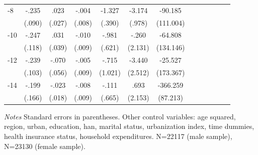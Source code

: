 \begin{table}[p]
\begin{adjustbox}{max width=\linewidth}
\begin{threeparttable}
{\begin{tabular}{l*{6}{SS}}
-8             &    -.235\sym{***}&     .023         &    -.004         &   -1.327\sym{***}&   -3.174\sym{***}&  -90.185         \\
                &   (.090)         &   (.027)         &   (.008)         &   (.390)         &   (.978)         &(111.004)         \\
-10            &    -.247\sym{**} &     .031         &    -.010         &    -.981         &    -.260         &  -64.808         \\
                &   (.118)         &   (.039)         &   (.009)         &   (.621)         &  (2.131)         &(134.146)         \\
-12           &    -.239\sym{**} &    -.070         &    -.005         &    -.715         &   -3.440         &  -25.527         \\
                &   (.103)         &   (.056)         &   (.009)         &  (1.021)         &  (2.512)         &(173.367)         \\
-14           &    -.199         &    -.023         &    -.008         &    -.111         &     .693         & -366.259\sym{***}\\
                &   (.166)         &   (.018)         &   (.009)         &   (.665)         &  (2.153)         & (87.213)         \\      
\bottomrule
\end{tabular}
\begin{tablenotes}
\item \textit{Notes}   Standard errors in parentheses.
Other control variables: age squared, region, urban, education, han, marital status, urbanization index, time dummies, health insurance status, household expenditures. N=22117 (male sample), N=23130 (female sample).
\end{tablenotes}
}
\end{threeparttable}
\end{adjustbox}
\end{table}


